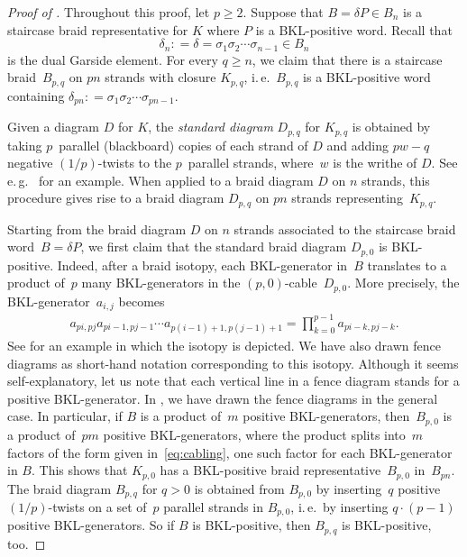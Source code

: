 \documentclass{amsart}
\theoremstyle{definition}
\theoremstyle{remark}
\theoremstyle{plain}
\newcommand{\defeq}{\mathrel{\mathop:}=}
\newcommand{\ie}{i.\,e.~}
\newcommand{\eg}{e.\,g.~}
\newcommand{\sigij}{a_{i,j}}
\begin{document}
\begin{proof}[{Proof of }]
    Throughout this proof, let $p \geq 2$. Suppose that $B = \delta P \in B_n$ is a staircase braid representative for $K$ where $P$ is a BKL-positive word. Recall that $$\delta_n \defeq \delta=\sigma_1 \sigma_2 \cdots \sigma_{n-1} \in B_n$$ is the dual Garside element. For every $q \geq n$, we claim that there is a staircase braid~$B_{p,q}$ on $pn$ strands with closure $K_{p,q}$, \ie $B_{p,q}$ is a BKL-positive word containing $\delta_{pn} \defeq \sigma_1 \sigma_2 \cdots \sigma_{pn-1}$. 

    Given a diagram $D$ for $K$, the \emph{standard diagram} $D_{p,q}$ for $K_{p,q}$ is obtained by taking $p$~parallel (blackboard) copies of each strand of $D$ and adding $pw-q$ negative $(1/p)$-twists to the $p$~parallel strands, where~$w$ is the writhe of $D$. See \eg \cite[Figure~7]{kmms} for an example. When applied to a braid diagram $D$ on $n$ strands, this procedure gives rise to a braid diagram $D_{p,q}$ on $pn$ strands representing~$K_{p,q}$.  
    
    Starting from the braid diagram $D$ on $n$ strands associated to the staircase braid word~$B = \delta P$, we first claim that the standard braid diagram $D_{p,0}$ is BKL-positive. Indeed, after a braid isotopy, each BKL-generator in~$B$ translates to a product of~$p$ many BKL-generators in the $(p,0)$-cable~$D_{p,0}$. More precisely, the BKL-generator~$\sigij$ becomes 
    \begin{align}\label{eq:cabling}
        a_{pi,pj} a_{pi-1,pj-1}\cdots a_{p(i-1)+1,p(j-1)+1} = \prod_{k=0}^{p-1} a_{pi-k,pj-k}.
    \end{align}
    See  for an example in which the isotopy is depicted. We have also drawn fence diagrams as short-hand notation corresponding to this isotopy. Although it seems self-explanatory, let us note that each vertical line in a fence diagram stands for a positive BKL-generator. In , we have drawn the fence diagrams in the general case. In particular, if $B$ is a product of~$m$ positive BKL-generators, then~$B_{p,0}$ is a product of~$pm$ positive BKL-generators, where the product splits into~$m$ factors of the form given in~\eqref{eq:cabling}, one such factor for each BKL-generator in $B$. This shows that $K_{p,0}$ has a BKL-positive braid representative~$B_{p,0}$ in~$B_{pn}$. The braid diagram $B_{p,q}$ for $q > 0 $ is obtained from $B_{p,0}$ by inserting~$q$ positive $(1/p)$-twists on a set of~$p$ parallel strands in $B_{p,0}$, \ie by inserting $q \cdot (p-1)$ positive BKL-generators. So if $B$ is BKL-positive, then $B_{p,q}$ is BKL-positive, too.


\end{proof}
\end{document}
